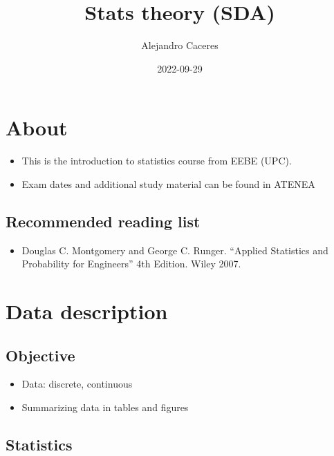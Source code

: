\documentclass[
]{book}
\title{Stats theory (SDA)}
\author{Alejandro Caceres}
\date{2022-09-29}
\providecommand{\tightlist}{%
  \setlength{\itemsep}{0pt}\setlength{\parskip}{0pt}}
\begin{document}
\maketitle

{
\setcounter{tocdepth}{1}
\tableofcontents
}
\hypertarget{about}{%
\chapter{About}\label{about}}

\begin{itemize}
\item
  This is the introduction to statistics course from EEBE (UPC).
\item
  Exam dates and additional study material can be found in ATENEA
\end{itemize}

\hypertarget{recommended-reading-list}{%
\section{Recommended reading list}\label{recommended-reading-list}}

\begin{itemize}
\tightlist
\item
  Douglas C. Montgomery and George C. Runger. ``Applied Statistics and Probability for Engineers'' 4th Edition. Wiley 2007.
\end{itemize}

\hypertarget{data-description}{%
\chapter{Data description}\label{data-description}}

\hypertarget{objective}{%
\section{Objective}\label{objective}}

\begin{itemize}
\tightlist
\item
  Data: discrete, continuous
\item
  Summarizing data in tables and figures
\end{itemize}

\hypertarget{statistics}{%
\section{Statistics}\label{statistics}}
\end{document}

